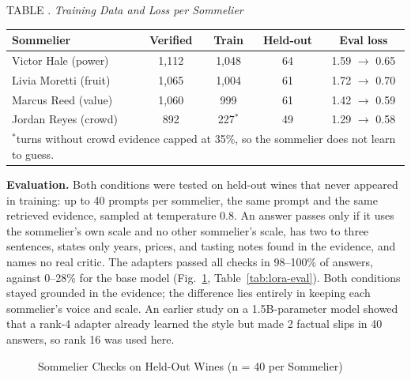 \documentclass[conference]{IEEEtran}
\begin{document}
\par\smallskip
\noindent\begin{minipage}{\columnwidth}
\centering
{}\label{tab:ai-data}
{\footnotesize TABLE . \textit{Training Data and Loss per Sommelier}\par}
\smallskip
\footnotesize
\setlength{\tabcolsep}{3pt}
\begin{tabular}{|l|c|c|c|c|}
\hline
Sommelier & Verified & Train & Held-out & Eval loss \\
\hline Victor Hale (power) & 1,112 & 1,048 & 64 & 1.59 $\rightarrow$ 0.65 \\
\hline Livia Moretti (fruit) & 1,065 & 1,004 & 61 & 1.72 $\rightarrow$ 0.70 \\
\hline Marcus Reed (value) & 1,060 & 999 & 61 & 1.42 $\rightarrow$ 0.59 \\
\hline Jordan Reyes (crowd) & 892 & 227$^{*}$ & 49 & 1.29 $\rightarrow$ 0.58 \\
\hline
\multicolumn{5}{l}{\scriptsize $^{*}$turns without crowd evidence capped at 35\%, so the sommelier does not learn to guess.}
\end{tabular}
\end{minipage}\par\smallskip
\textbf{Evaluation.} Both conditions were tested on held-out wines that never appeared in training: up to 40 prompts per sommelier, the same prompt and the same retrieved evidence, sampled at temperature 0.8. An answer passes only if it uses the sommelier's own scale and no other sommelier's scale, has two to three sentences, states only years, prices, and tasting notes found in the evidence, and names no real critic. The adapters passed all checks in 98--100\% of answers, against 0--28\% for the base model (Fig.~\ref{fig:ai-results}, Table~\ref{tab:lora-eval}). Both conditions stayed grounded in the evidence; the difference lies entirely in keeping each sommelier's voice and scale. An earlier study on a 1.5B-parameter model showed that a rank-4 adapter already learned the style but made 2 factual slips in 40 answers, so rank 16 was used here.

\begin{figure}[htbp]
\centering
{}
\caption{Sommelier Checks on Held-Out Wines (n = 40 per Sommelier)}
\label{fig:ai-results}
\end{figure}
\end{document}
